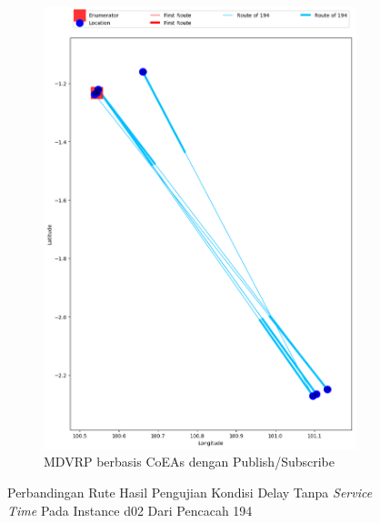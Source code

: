 \begin{figure}[H]\ContinuedFloat
	\centering
	\begin{subfigure}[t]{\textwidth}
		\centering
		\includegraphics[width=\textwidth]{Resources/Images/delayed_2/real_m15_n100_delayed_2_194_pubsub_coes}
		\caption{MDVRP berbasis CoEAs dengan Publish/Subscribe}
		\label{fig:real_m15_n100_delayed_2_194_pubsub_coes}
	\end{subfigure}
	\caption{Perbandingan Rute Hasil Pengujian Kondisi Delay Tanpa \textit{Service Time} Pada Instance d02 Dari Pencacah 194}
	\label{fig:real_m15_n100_delayed_2_194_contd}
\end{figure}


